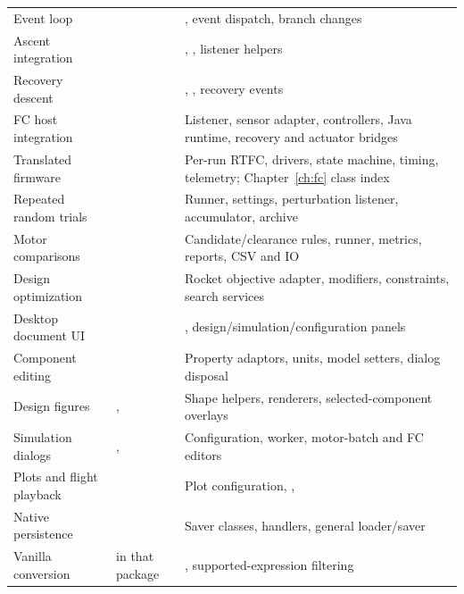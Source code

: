 \begin{longtable}{@{}L{3.4cm}L{7.0cm}L{5.4cm}@{}}
Event loop &  & , event dispatch, branch changes\\
Ascent integration &  & , , listener helpers\\
Recovery descent &  & , , recovery events\\
FC host integration &  & Listener, sensor adapter, controllers, Java runtime, recovery and actuator bridges\\
Translated firmware &  & Per-run RTFC, drivers, state machine, timing, telemetry; Chapter~\ref{ch:fc} class index\\
Repeated random trials &  & Runner, settings, perturbation listener, accumulator, archive\\
Motor comparisons &  & Candidate/clearance rules, runner, metrics, reports, CSV and IO\\
Design optimization &  & Rocket objective adapter, modifiers, constraints, search services\\
Desktop document UI &  & , design/simulation/configuration panels\\
Component editing &  & Property adaptors, units, model setters, dialog disposal\\
Design figures & ,  & Shape helpers, renderers, selected-component overlays\\
Simulation dialogs & ,  & Configuration, worker, motor-batch and FC editors\\
Plots and flight playback &  & Plot configuration, , \\
Native persistence &  & Saver classes,  handlers, general loader/saver\\
Vanilla conversion &  in that package & , supported-expression filtering\\

\end{longtable}
